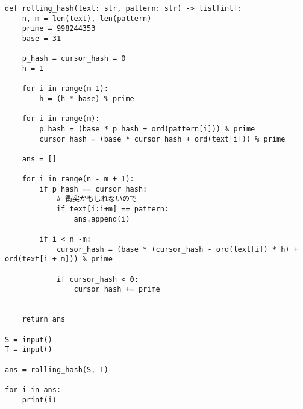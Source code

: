 \documentclass{jlreq}
\begin{document}
\begin{lstlisting}[caption=ラビン・カープ法の実装, frame=TRBL, label={Rabin-Karp}]
def rolling_hash(text: str, pattern: str) -> list[int]:
    n, m = len(text), len(pattern)
    prime = 998244353
    base = 31

    p_hash = cursor_hash = 0
    h = 1
    
    for i in range(m-1):
        h = (h * base) % prime

    for i in range(m):
        p_hash = (base * p_hash + ord(pattern[i])) % prime
        cursor_hash = (base * cursor_hash + ord(text[i])) % prime

    ans = []

    for i in range(n - m + 1):
        if p_hash == cursor_hash:
            # 衝突かもしれないので
            if text[i:i+m] == pattern:
                ans.append(i)

        if i < n -m:
            cursor_hash = (base * (cursor_hash - ord(text[i]) * h) + ord(text[i + m])) % prime

            if cursor_hash < 0:
                cursor_hash += prime

    
    return ans

S = input()
T = input()

ans = rolling_hash(S, T)

for i in ans:
    print(i)
\end{lstlisting}
\end{document}
